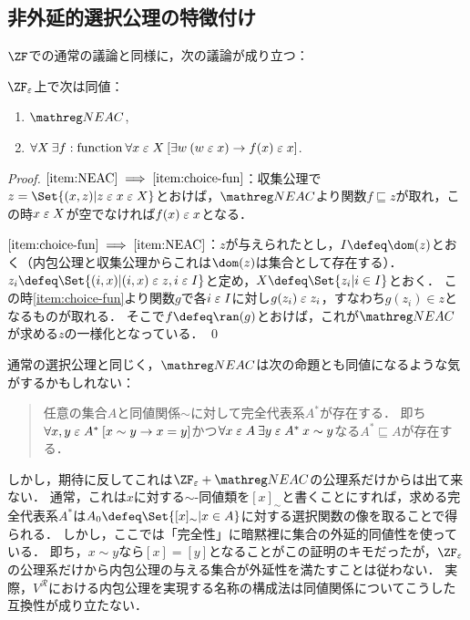 \documentclass[realisability.tex]{subfiles}
\begin{document}
\subsection{非外延的選択公理の特徴付け}
$\ZF$での通常の議論と同様に，次の議論が成り立つ：
\begin{lemma}
 $\ZFe$上で次は同値：
 \begin{enumerate}
  \item \label{item:NEAC} $\NEAC$,
  \item \label{item:choice-fun} $\forall X \: \exists f: \text{function}\: \forall x \mathrel{\varepsilon} X \: [\exists w \: (w \mathrel{\varepsilon} x) \to f(x) \mathrel{\varepsilon} x]$.
 \end{enumerate}
\end{lemma}
\begin{proof}
 $\ref{item:NEAC} \implies \ref{item:choice-fun}$：収集公理で$z = \Set{(x, z) | z \strin x \strin X}$とおけば，$\NEAC$より関数$f \sqsubseteq z$が取れ，この時$x \mathrel{\varepsilon} X$が空でなければ$f(x) \mathrel{\varepsilon} x$となる．

 $\ref{item:choice-fun} \implies \ref{item:NEAC}$：$z$が与えられたとし，$I \defeq \dom(z)$とおく（内包公理と収集公理からこれは$\dom(z)$は集合として存在する）．
 $z_i \defeq \Set{(i, x) | (i, x) \strin z, i \strin I}$と定め，$X \defeq \Set{z_i |  i \in I}$とおく．
 この時\ref{item:choice-fun}より関数$g$で各$i \mathrel{\varepsilon} I$に対し$g(z_i) \mathrel{\varepsilon} z_i$，すなわち$g(z_i) \in z$となるものが取れる．
 そこで$f \defeq \ran(g)$とおけば，これが$\NEAC$が求める$z$の一様化となっている． \qed
\end{proof}

\begin{remark}
 通常の選択公理と同じく，$\NEAC$は次の命題とも同値になるような気がするかもしれない：
 \begin{quote}
  任意の集合$A$と同値関係$\sim$に対して完全代表系$A^*$が存在する．
  即ち$\forall x, y \mathrel{\varepsilon} A^* \: [x \sim y \to x = y]$かつ$\forall x \mathrel{\varepsilon} A\: \exists y \mathrel{\varepsilon} A^* \: x \sim y$なる$A^* \sqsubseteq A$が存在する．
 \end{quote}
 しかし，期待に反してこれは$\ZFe + \NEAC$の公理系だけからは出て来ない．
 通常，これは$x$に対する$\sim$-同値類を$[x]_{\sim}$と書くことにすれば，求める完全代表系$A^*$は$A_0 \defeq \Set{[x]_{\sim} | x \in A}$に対する選択関数の像を取ることで得られる．
 しかし，ここでは「完全性」に暗黙裡に集合の外延的同値性を使っている．
 即ち，$x \sim y$なら$[x] = [y]$となることがこの証明のキモだったが，$\ZFe$の公理系だけから内包公理の与える集合が外延性を満たすことは従わない．
 実際，$V^{\mathcal{R}}$における内包公理を実現する名称の構成法は同値関係についてこうした互換性が成り立たない．
\end{remark}
\end{document}
